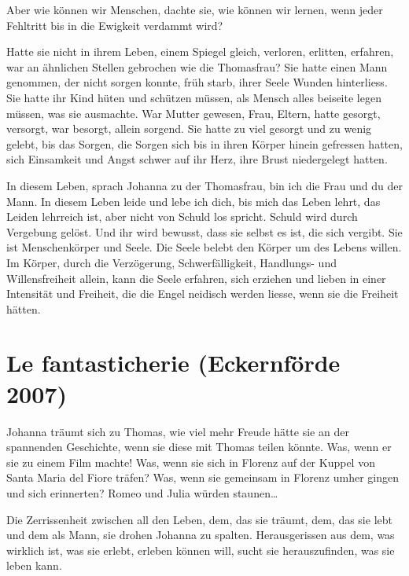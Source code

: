 \documentclass[10pt,titlepage,a5paper]{book}
\begin{document}
Aber wie können wir Menschen, dachte sie, wie können wir lernen, wenn jeder Fehltritt bis in die Ewigkeit verdammt wird?

Hatte sie nicht in ihrem Leben, einem Spiegel gleich, verloren, erlitten, erfahren, war an ähnlichen Stellen gebrochen wie die Thomasfrau?
Sie hatte einen Mann genommen, der nicht sorgen konnte, früh starb, ihrer Seele Wunden hinterliess. Sie hatte ihr Kind hüten und schützen müssen, als Mensch alles beiseite legen müssen, was sie ausmachte. War Mutter gewesen, Frau, Eltern, hatte gesorgt, versorgt, war besorgt, allein sorgend. Sie hatte zu viel gesorgt und zu wenig gelebt, bis das Sorgen, die Sorgen sich bis in ihren Körper hinein gefressen hatten, sich Einsamkeit und Angst schwer auf ihr Herz, ihre Brust niedergelegt hatten.

In diesem Leben, sprach Johanna zu der Thomasfrau, bin ich die Frau und du der Mann. In diesem Leben leide und lebe ich dich, bis mich das Leben lehrt, das Leiden lehrreich ist, aber nicht von Schuld los spricht.
Schuld wird durch Vergebung gelöst. Und ihr wird bewusst, dass sie selbst es ist, die sich vergibt. Sie ist Menschenkörper und Seele. Die Seele belebt den Körper um des Lebens willen. Im Körper, durch  die Verzögerung, Schwerfälligkeit, Handlungs- und Willensfreiheit allein, kann die Seele erfahren, sich erziehen und lieben in einer Intensität und Freiheit, die die Engel neidisch werden liesse, wenn sie die Freiheit hätten.



\section*{Le fantasticherie (Eckernförde 2007)}




Johanna träumt sich zu Thomas, wie viel mehr Freude hätte sie an der spannenden Geschichte, wenn sie diese mit Thomas teilen könnte.
Was, wenn er sie zu einem Film machte! Was, wenn sie sich in Florenz auf der Kuppel von Santa Maria del Fiore träfen? Was, wenn sie gemeinsam in Florenz umher gingen und sich erinnerten? Romeo und Julia würden staunen\dots 

Die Zerrissenheit zwischen all den Leben, dem, das sie träumt, dem, das sie lebt und dem als Mann, sie drohen Johanna zu spalten. Herausgerissen aus dem, was wirklich ist, was sie erlebt, erleben können will, sucht sie herauszufinden, was sie leben kann.
\end{document}
